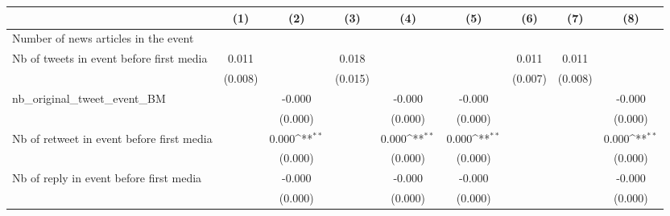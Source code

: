 {
\def\sym#1{\ifmmode^{#1}\else\(^{#1}\)\fi}
\begin{tabular}{l*{8}{c}}
\hline\hline
                    &\multicolumn{1}{c}{(1)}         &\multicolumn{1}{c}{(2)}         &\multicolumn{1}{c}{(3)}         &\multicolumn{1}{c}{(4)}         &\multicolumn{1}{c}{(5)}         &\multicolumn{1}{c}{(6)}         &\multicolumn{1}{c}{(7)}         &\multicolumn{1}{c}{(8)}         \\
\hline
Number of news articles in the event&                     &                     &                     &                     &                     &                     &                     &                     \\
Nb of tweets in event before first media&       0.011         &                     &       0.018         &                     &                     &       0.011         &       0.011         &                     \\
                    &     (0.008)         &                     &     (0.015)         &                     &                     &     (0.007)         &     (0.008)         &                     \\
nb\_original\_tweet\_event\_BM&                     &      -0.000         &                     &      -0.000         &      -0.000         &                     &                     &      -0.000         \\
                    &                     &     (0.000)         &                     &     (0.000)         &     (0.000)         &                     &                     &     (0.000)         \\
Nb of retweet in event before first media&                     &       0.000\sym{**} &                     &       0.000\sym{**} &       0.000\sym{**} &                     &                     &       0.000\sym{**} \\
                    &                     &     (0.000)         &                     &     (0.000)         &     (0.000)         &                     &                     &     (0.000)         \\
Nb of reply in event before first media&                     &      -0.000         &                     &      -0.000         &      -0.000         &                     &                     &      -0.000         \\
                    &                     &     (0.000)         &                     &     (0.000)         &     (0.000)         &                     &                     &     (0.000)         \\

\end{tabular}}
